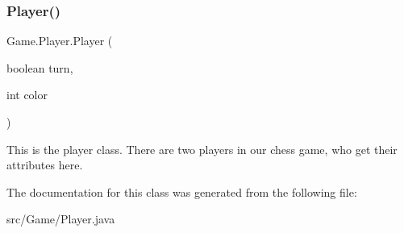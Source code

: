 \subsubsection{\texorpdfstring{Player()}{Player()}}
{\footnotesize\ttfamily Game.\+Player.\+Player (\begin{DoxyParamCaption}\item[{boolean}]{turn,  }\item[{int}]{color }\end{DoxyParamCaption})\hspace{0.3cm}{\ttfamily [inline]}}

This is the player class. There are two players in our chess game, who get their attributes here. 

The documentation for this class was generated from the following file\+:\begin{DoxyCompactItemize}
\item 
src/\+Game/Player.\+java\end{DoxyCompactItemize}
